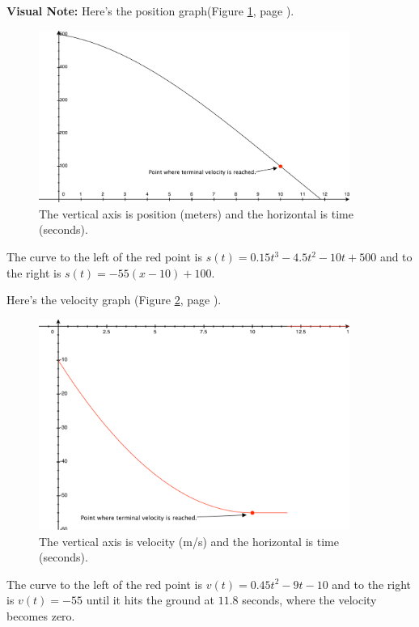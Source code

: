 \documentclass[12pt,addpoints, answers, fleqn]{exam}
\begin{document}
\begin{questions}
\begin{solution}
\end{solution}
\textbf{Visual Note:} Here's the position graph(Figure \ref{fig:graph2601}, page \pageref{fig:graph2601}).
\begin{figure}[htbp] %
   \centering
   \includegraphics[width=4in]{./graphics/graph2601.pdf} 
   \caption{The vertical axis is position (meters) and the horizontal is time (seconds).}
   \label{fig:graph2601}
\end{figure}

The curve to the left of the red point is $s\left(t\right) = 0.15t^3 - 4.5t^2 - 10t + 500$ and to the right is $s\left(t\right) = -55 \left(x-10\right) +100$.



Here's the velocity graph (Figure \ref{fig:graph2602}, page \pageref{fig:graph2602}).
\begin{figure}[htbp] %
   \centering
   \includegraphics[width=4in]{./graphics/graph2602.pdf} 
   \caption{The vertical axis is velocity (m/s) and the horizontal is time (seconds).}
   \label{fig:graph2602}
\end{figure}

The curve to the left of the red point is $v\left(t\right) = 0.45t^2 - 9t - 10$ and to the right is $v\left(t\right) = -55$ until it hits the ground at $11.8$ seconds, where the velocity becomes zero.


\end{questions}
\end{document}
